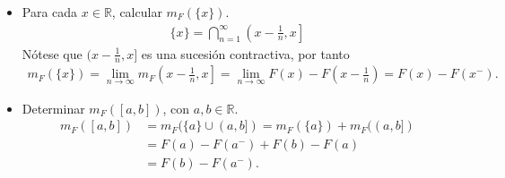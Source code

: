 \begin{ejemplo}
    \begin{itemize}
        \item Para cada $x \in \mathbb{R}$, calcular $m_F(\{x\})$.
              \begin{align*}
                  \{x\} = \bigcap_{n=1}^{\infty}\left( x - \frac{1}{n}, x \right]
              \end{align*}
              Nótese que $( x - \frac{1}{n}, x]$ es una sucesión contractiva, por tanto
              \begin{align*}
                  m_F(\{x\}) = \lim_{n \to \infty}{m_F}\left( x - \frac{1}{n}, x \right] = \lim_{n \to \infty}{F(x) - F\left(x -\frac{1}{n}\right)} = F(x) - F(x^-).
              \end{align*}
        \item Determinar $m_F([a,b])$, con $a,b \in \mathbb{R}$.
              \begin{align*}
                  m_F([a,b]) & = m_F(\{a\} \cup (a,b]) = m_F(\{a\}) + m_F((a,b]) \\
                             & = F(a) - F(a^-) + F(b) - F(a)                     \\
                             & = F(b) - F(a^-).
              \end{align*}
    \end{itemize}
\end{ejemplo}

